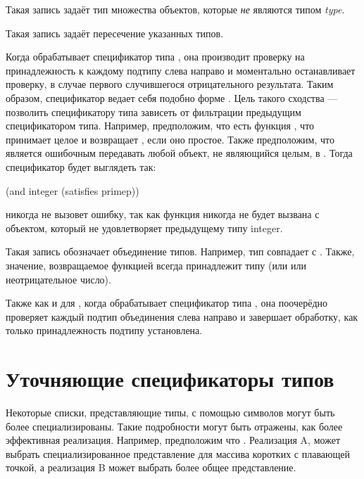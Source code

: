 \begin{flushdesc}
\item[\cd{(not \emph{type})}]

Такая запись задаёт тип множества объектов, которые \emph{не} являются типом {\it
  type}.
\item[\cd{(and \emph{type1} \emph{type2} ...)}]

Такая запись задаёт пересечение указанных типов.

Когда  обрабатывает спецификатор типа , она производит
проверку на принадлежность к каждому подтипу слева направо и моментально
останавливает проверку, в случае первого случившегося отрицательного
результата. Таким образом, спецификатор  ведает себя подобно форме
. Цель такого сходства --- позволить спецификатору типа 
зависеть от фильтрации предыдущим спецификатором типа. Например, предположим,
что есть функция , что принимает целое и возвращает {\true}, если оно
простое. Также предположим, что является ошибочным передавать любой объект, не
являющийся целым, в . Тогда спецификатор будет выглядеть так:
\begin{lisp}
(and integer (satisfies primep))
\end{lisp}
никогда не вызовет ошибку, так как функция  никогда не будет вызвана
с объектом, который не удовлетворяет предыдущему типу integer.

\item[\cd{(or \emph{type1} \emph{type2} ...)}]

Такая запись обозначает объединение типов. Например, тип  совпадает с
. Также, значение, возвращаемое функцией  всегда
принадлежит типу  (или {\nil} или неотрицательное число).

Также как и для , когда  обрабатывает спецификатор типа
, она поочерёдно проверяет каждый подтип объединения слева направо и
завершает обработку, как только принадлежность подтипу установлена.
\end{flushdesc}

\section{Уточняющие спецификаторы типов}
\label{SPECIALIZED-TYPE-SPECIFIER-SECTION}

Некоторые списки, представляющие типы, с помощью символов могут быть более
специализированы. Такие подробности могут быть отражены, как более эффективная
реализация. Например, предположим что . Реализация A,
может выбрать специализированное представление для массива коротких с плавающей
точкой, а реализация B может выбрать более общее представление.

